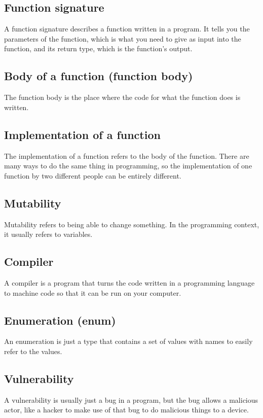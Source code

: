 \documentclass[11pt]{article}
\begin{document}
\subsection{Function signature}
\label{sec:org989e263}
A function signature describes a function written
in a program. It tells you the parameters of the
function, which is what you need to give as input
into the function, and its return type, which is
the function's output.

\subsection{Body of a function (function body)}
\label{sec:org8772366}
The function body is the place where the code
for what the function does is written.

\subsection{Implementation of a function}
\label{sec:org8f21de3}
The implementation of a function refers to the
body of the function. There are many ways
to do the same thing in programming, so the
implementation of one function by two different
people can be entirely different.

\subsection{Mutability}
\label{sec:orgec4d1bb}
Mutability refers to being able to change something.
In the programming context, it usually refers to variables.

\subsection{Compiler}
\label{sec:org249d3a1}
A compiler is a program that turns the code
written in a programming language to machine code
so that it can be run on your computer.

\subsection{Enumeration (enum)}
\label{sec:org1746d9b}
An enumeration is just a type that contains a set
of values with names to easily refer to the values.

\subsection{Vulnerability}
\label{sec:orgf561686}
A vulnerability is usually just a bug in a program,
but the bug allows a malicious actor, like a hacker
to make use of that bug to do malicious things
to a device.
\end{document}
